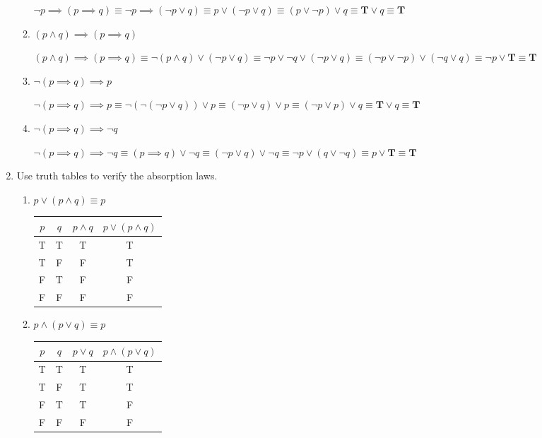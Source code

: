 \documentclass[11pt]{article}
\begin{document}
\begin{enumerate}[label=\textbf{\arabic*.}]
\begin{enumerate}[label=\textbf{\alph*)}]
		$\neg p \implies (p \implies q) \equiv \neg p \implies (\neg p \lor q) \equiv p \lor (\neg p \lor q) \equiv (p \lor \neg p) \lor q \equiv \textbf{T} \lor q \equiv \textbf{T}$
		
		\item $(p \land q) \implies (p \implies q)$
		
		$(p \land q) \implies (p \implies q) \equiv \neg(p \land q) \lor (\neg p \lor q) \equiv \neg p \lor \neg q \lor (\neg p \lor q) \equiv (\neg p \lor \neg p) \lor (\neg q \lor q) \equiv \neg p \lor \textbf{T} \equiv \textbf{T}$
		
		\item $\neg(p \implies q) \implies p$
		
		$\neg(p \implies q) \implies p \equiv \neg(\neg(\neg p \lor q)) \lor p \equiv (\neg p \lor q) \lor p \equiv (\neg p \lor p) \lor q \equiv \textbf{T} \lor q \equiv \textbf{T}$
		
		\item $\neg(p \implies q) \implies \neg q$
		
		$\neg(p \implies q) \implies \neg q \equiv (p \implies q) \lor \neg q \equiv (\neg p \lor q) \lor \neg q \equiv \neg p \lor (q \lor \neg q) \equiv p \lor \textbf{T} \equiv \textbf{T}$
	\end{enumerate}

	\item Use truth tables to verify the absorption laws.
	\begin{enumerate}[label=\textbf{\alph*)}]
		\item $p \lor (p \land q) \equiv p$
		
		\begin{tabular}{c | c | c | c}
			$p$ & $q$ & $p \land q$ & $p \lor (p \land q)$ \\
			\hline
			T & T & T & T \\
			T & F & F & T \\
			F & T & F & F \\
			F & F & F & F 
		\end{tabular}
		
		\item $p \land (p \lor q) \equiv p$
		
		\begin{tabular}{c | c | c | c}
			$p$ & $q$ & $p \lor q$ & $p \land (p \lor q)$ \\
			\hline
			T & T & T & T \\
			T & F & T & T \\
			F & T & T & F \\
			F & F & F & F
		\end{tabular}
	\end{enumerate}


\end{enumerate}
\end{document}
